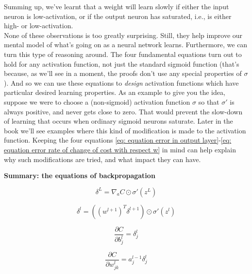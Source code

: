 Summing up, we've learnt that a weight will learn slowly if either the input neuron is low-activation, or if the output neuron has saturated, i.e., is either high- or low-activation.\\

None of these observations is too greatly surprising. Still, they help improve our mental model of what's going on as a neural network learns. Furthermore, we can turn this type of reasoning around. The four fundamental equations turn out to hold for any activation function, not just the standard sigmoid function (that's because, as we'll see in a moment, the proofs don't use any special properties of $\sigma$). And so we can use these equations to \textit{design} activation functions which have particular desired learning properties. As an example to give you the idea, suppose we were to choose a (non-sigmoid) activation function $\sigma$ so that $\sigma'$ is always positive, and never gets close to zero. That would prevent the slow-down of learning that occurs when ordinary sigmoid neurons saturate. Later in the book we'll see examples where this kind of modification is made to the activation function. Keeping the four equations \ref{eq: equation error in output layer}-\ref{eq: equation error rate of change of cost with respect w} in mind can help explain why such modifications are tried, and what impact they can have.\\


\begin{tcolorbox}[
    width=0.8\textwidth,
    center
]
\textbf{Summary: the equations of backpropagation}
\begin{fleqn}
\begin{equation}
\delta^L=\nabla_a C \odot \sigma'(z^L)
\tag{BP1a}
\end{equation}

\begin{equation}
\delta^l=\left(\left(w^{l+1}\right)^T\delta^{l+1}\right)\odot\sigma'\left(z^l\right)
\tag{BP2}
\end{equation}

\begin{equation}
\frac{\partial C}{\partial b^l_j}=\delta^l_j
\tag{BP3}
\end{equation}

\begin{equation}
\frac{\partial C}{\partial w^l_{jk}}=a^{l-1}_j \delta^l_j 
\tag{BP4}
\end{equation}
\end{fleqn}
\label{eq: box of foundamentals backprop eqns}
\end{tcolorbox}


